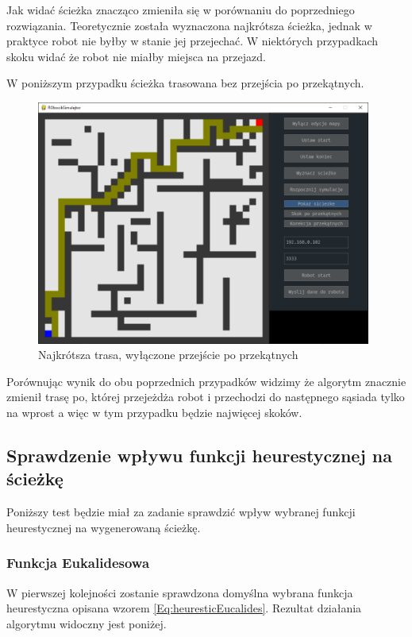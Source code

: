 Jak widać ścieżka znacząco zmieniła się w porównaniu do poprzedniego rozwiązania. Teoretycznie została wyznaczona najkrótsza 
ścieżka, jednak w praktyce robot nie byłby w stanie jej przejechać. 
W niektórych przypadkach skoku widać że robot nie miałby miejsca na przejazd.

W poniższym przypadku ścieżka trasowana bez przejścia po przekątnych. 

\begin{figure}[H]
	\centering
	\includegraphics[width=11cm]{pages/testy/zdjecia/t2_3.png}
	\caption{Najkrótsza trasa, wyłączone przejście po przekątnych}
\end{figure}
Porównując wynik do obu poprzednich przypadków widzimy że algorytm znacznie zmienił trasę po, której przejeżdża robot
i przechodzi do następnego sąsiada tylko na wprost a więc w tym przypadku będzie najwięcej skoków.

\clearpage
\subsection{Sprawdzenie wpływu funkcji heurestycznej na ścieżkę}
Poniższy test będzie miał za zadanie sprawdzić wpływ wybranej funkcji heurestycznej na wygenerowaną ścieżkę.
\subsubsection{Funkcja Eukalidesowa}
W pierwszej kolejności zostanie sprawdzona domyślna wybrana funkcja heurestyczna opisana wzorem \eqref{Eq:heuresticEucalides}.
Rezultat działania algorytmu widoczny jest poniżej.


